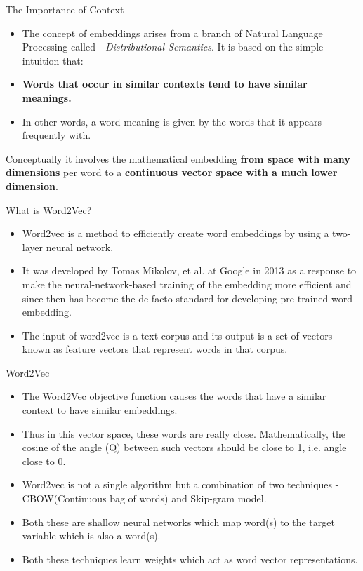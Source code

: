 \documentclass[11pt]{beamer}
\begin{document}
\begin{frame}{The Importance of Context}
	\begin{itemize}
		\item The concept of embeddings arises from a branch of Natural Language Processing called - \textit{Distributional Semantics}. It is based on the simple intuition that:
		\item \textbf{Words that occur in similar contexts tend to have similar meanings.}
		\item In other words, a word meaning is given by the words that it appears frequently with.
	\end{itemize}
	
\begin{tcolorbox}
Conceptually it involves the mathematical embedding \textbf{from space with many dimensions} per word to a \textbf{continuous vector space with a much lower dimension}.
\end{tcolorbox}

\end{frame}
\begin{frame}{What is Word2Vec?}
	\begin{itemize}
		\item Word2vec is a method to efficiently create word embeddings by using a two-layer neural network.  
		\item It was developed by Tomas Mikolov, et al. at Google in 2013 as a response to make the neural-network-based training of the embedding more efficient and since then has become the de facto standard for developing pre-trained word embedding. 		  
		\item The input of word2vec is a text corpus and its output is a set of vectors known as feature vectors that represent words in that corpus. 
		
	\end{itemize}
\end{frame}
\begin{frame}{Word2Vec}
	\begin{itemize}
	\item The Word2Vec objective function causes the words that have a similar context to have similar embeddings. 
		\item Thus in this vector space, these words are really close. Mathematically, the cosine of the angle (Q) between such vectors should be close to 1, i.e. angle close to 0.
		\item Word2vec is not a single algorithm but a combination of two techniques - CBOW(Continuous bag of words) and Skip-gram model.
		\item Both these are shallow neural networks which map word(s) to the target variable which is also a word(s). 
		\item Both these techniques learn weights which act as word vector representations. 
	\end{itemize}
\end{frame}
\end{document}
